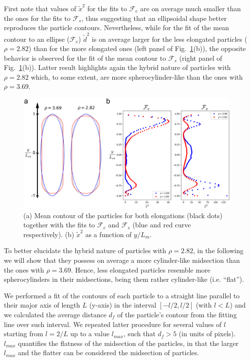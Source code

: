 \documentclass[aip,graphicx]{revtex4-1} %
\begin{document}
First note that values of $\widetilde{x}^2$ for the fits to $\mathcal{F}_e$ 
are on average much smaller than the ones for the fits to $\mathcal{F}_s$, 
thus suggesting that an ellipsoidal shape better reproduces the particle contours. Nevertheless, while for the fit of the 
mean contour to an ellipse ($\mathcal{F}_e$) $\widetilde{d}^2$ is on average larger for the less elongated particles ($\rho=2.82$) 
than for the more elongated ones (left panel of Fig.~\ref{fig:Mean_bord}(b)), 
the opposite behavior is observed for the fit of the mean contour to $\mathcal{F}_s$ (right panel of Fig.~\ref{fig:Mean_bord}(b)). 
Latter result highlights again the hybrid nature of particles with $\rho=2.82$ which, to some extent, are more spherocylinder-like 
than the ones with $\rho=3.69$.

\begin{figure}
    \centering
    \includegraphics[width=0.7\columnwidth]{Mean_bord.png}
\caption{(a) Mean contour of the particles for both elongations (black dots) together with the fits to $\mathcal{F}_e$ and 
$\mathcal{F}_s$ (blue and red curve respectively). (b) $\widetilde{x}^2$ as a function of $y/L_m$.}\label{fig:Mean_bord}
\end{figure}

To better elucidate the hybrid nature of particles with $\rho=2.82$, in the following we will show that they
possess on average a more cylinder-like midsection than the ones with $\rho=3.69$. 
Hence, less elongated particles resemble more spherocylinders in their midsections, being them rather cylinder-like (i.e. ``flat'').

We performed a fit of the contours of each particle to a straight line parallel to their major axis of length $L$ (y-axis)
in the interval $[-l/2, l/2]$ (with $l < L$) and we calculated the average distance $d_f$ of
the particle's contour from the fitting line over such interval. 
We repeated latter procedure for several values of $l$ starting from $l=2/L$ up to a value $l_{max}$, such that
$d_f > 5$ (in units of pixels). $l_{max}$ quantifies the flatness of the midsection of the particles, in that 
the larger $l_{max}$ and the flatter can be considered the midsection of particles.
\end{document}
